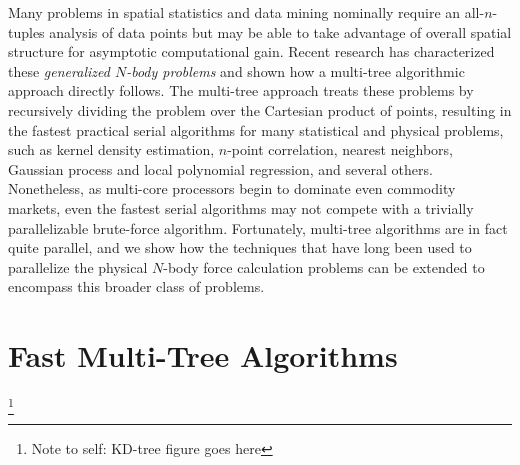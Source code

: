 \documentclass[times, leqno,twocolumn]{article}
\newcommand{\authornote}[1]{\footnote{Note to self: #1}}
\begin{document}
Many problems in spatial statistics and data mining nominally require an all-$n$-tuples analysis of data points but may be able to take advantage of overall spatial structure for asymptotic computational gain.
Recent research has characterized these {\it generalized $N$-body problems} and shown how a multi-tree algorithmic approach directly follows.
The multi-tree approach treats these problems by recursively dividing the problem over the Cartesian product of points, resulting in the fastest practical serial algorithms for many statistical and physical problems, such as kernel density estimation, $n$-point correlation, nearest neighbors, Gaussian process and local polynomial regression, and several others.
Nonetheless, as multi-core processors begin to dominate even commodity markets, even the fastest serial algorithms may not compete with a trivially parallelizable brute-force algorithm.
Fortunately, multi-tree algorithms are in fact quite parallel, and we show how the techniques that have long been used to parallelize the physical $N$-body force calculation problems can be extended to encompass this broader class of problems.

\section{Fast Multi-Tree Algorithms}

\authornote{KD-tree figure goes here}
\end{document}
